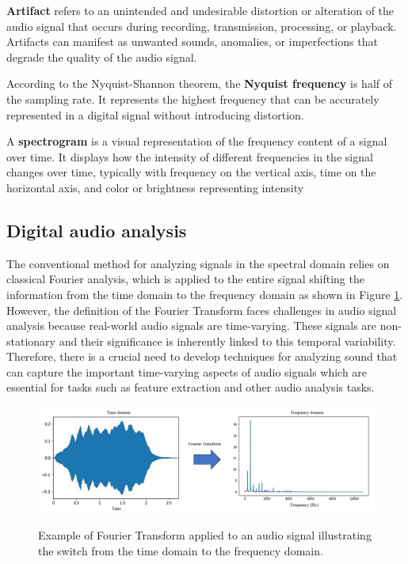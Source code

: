 
\textbf{Artifact} refers to an unintended and undesirable distortion or alteration of the audio signal that occurs during recording, transmission, processing, or playback. Artifacts can manifest as unwanted sounds, anomalies, or imperfections that degrade the quality of the audio signal.

According to the Nyquist-Shannon theorem, the \textbf{Nyquist frequency} is half of the sampling rate. It represents the highest frequency that can be accurately represented in a digital signal without introducing distortion.

A \textbf{spectrogram} is a visual representation of the frequency content of a signal over time. It displays how the intensity of different frequencies in the signal changes over time, typically with frequency on the vertical axis, time on the horizontal axis, and color or brightness representing intensity


\subsection{Digital audio analysis}
\label{subsec:audio_fundamentals_digital_audio_analsys}

The conventional method for analyzing signals in the spectral domain relies on classical Fourier analysis, which is applied to the entire signal shifting the information from the time domain to the frequency domain as shown in Figure \ref{fig:frmwk_digital_audio_fourier_transform}. However, the definition of the Fourier Transform faces challenges in audio signal analysis because real-world audio signals are time-varying. These signals are non-stationary and their significance is inherently linked to this temporal variability. Therefore, there is a crucial need to develop techniques for analyzing sound that can capture the important time-varying aspects of audio signals which are essential for tasks such as feature extraction and other audio analysis tasks.

\begin{figure}[htbp]
    \raggedright
        \caption{Example of Fourier Transform applied to an audio signal illustrating the switch from the time domain to the frequency domain.}
        \includegraphics[width=1.0\textwidth]{resources/images/030-theoretical_framework/Framework_digital_audio_fourier_transform.png}
        \label{fig:frmwk_digital_audio_fourier_transform}
\end{figure}

